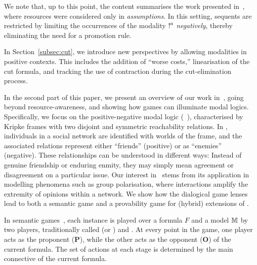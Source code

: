 We note that, up to this point, the content summarises the work presented in~\cite{DBLP:conf/tableaux/LangOPF19}, where resources were considered only in {\em assumptions}. In this setting, sequents are restricted by limiting the occurrences of the modality $\hbox{$\mathop{!}^{a}$}$ {\em negatively}, thereby eliminating the need for a promotion rule.

In Section~\ref{subsec:cut}, we introduce new perspectives by allowing modalities in positive contexts. This includes the addition of ``worse costs,'' linearisation of the cut formula, and tracking the use of contraction during the cut-elimination process.

In the second part of this paper, we present
an overview of our work in~\cite{LPAR2024:Reasoning_About_Group_Polarization},
going beyond resource-awareness, and showing how games can illuminate modal
logics. Specifically, we focus on the positive-negative modal logic
(\PNL~\cite{DBLP:journals/jolli/XiongA20}), characterised by Kripke frames with
two disjoint and symmetric reachability relations. 
In \PNL, individuals in a
social network are identified with worlds of the frame, and the associated relations represent
either ``friends'' (positive) or as ``enemies'' (negative).
These relationships can be understood in different ways: Instead
of genuine friendship or enduring enmity, they may simply mean agreement or
disagreement on a particular issue. 
Our interest in \PNL\ stems
from its application in modelling phenomena such as group polarisation, where
interactions amplify the extremity of opinions within a network. 
We show how the dialogical game lenses lead to both 
a semantic game and a
provability game for (hybrid) extensions of \PNL.


 

In semantic games~\cite{Hintikka1973-HINLLA-2}, each instance is played over a formula $F$ and a model $\mathbb{M}$ by two players, traditionally called \Ic (or \Me) and \You. At every point in the game, one player acts as the proponent ($\mathbf P$), while the other acts as the opponent ($\mathbf O$) of the current formula. The set of actions at each stage is determined by the main connective of the current formula.

